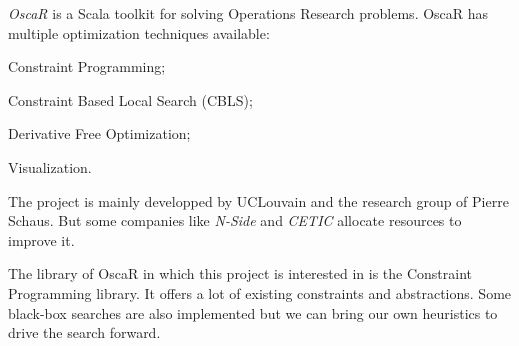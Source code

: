 \documentclass[../../thesis.tex]{subfiles}
\begin{document}
\emph{OscaR} \cite{oscar} is a Scala toolkit for solving Operations Research problems. 
OscaR has multiple optimization techniques available:
\begin{enumerate*}[label=(\roman*)]
  \item Constraint Programming;
  \item Constraint Based Local Search (CBLS);
  \item Derivative Free Optimization;
  \item Visualization.
\end{enumerate*}


The project is mainly developped by UCLouvain and the research group of Pierre Schaus. But some companies like \emph{N-Side} and \emph{CETIC} allocate resources to improve it.

The library of OscaR in which this project is interested in is the Constraint Programming library. It offers a lot of existing constraints and abstractions. Some black-box searches are also 
implemented but we can bring our own heuristics to drive the search forward.
\end{document}
